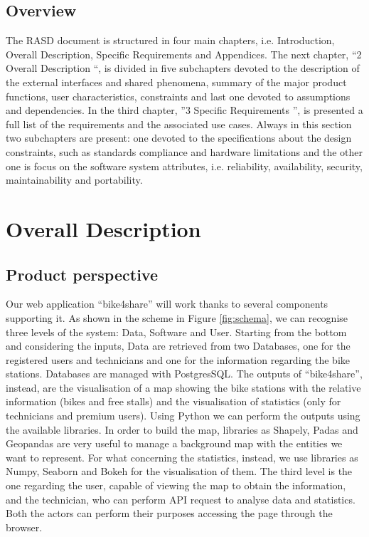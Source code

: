 \documentclass{article}
\begin{document}
\subsection{Overview}
The RASD document is structured in four main chapters, i.e. Introduction, Overall Description, Specific Requirements and Appendices. The next chapter, “2 Overall Description “, is divided in five subchapters devoted to the description of the external interfaces and shared phenomena, summary of the major product functions, user characteristics, constraints and last one devoted to assumptions and dependencies.
In the third chapter, ”3 Specific Requirements ”, is presented a full list of the requirements and the associated use cases. Always in this section two subchapters are present: one devoted to the specifications about the design constraints, such as standards compliance and hardware limitations and the other one is focus on the software system attributes, i.e. reliability, availability, security, maintainability and portability.

\section{Overall Description}
\subsection{Product perspective}
Our web application “bike4share” will work thanks to several components supporting it. As shown in the scheme in Figure \ref{fig:schema}, we can recognise three levels of the system: Data, Software and User. 
Starting from the bottom and considering the inputs, Data are retrieved from two Databases, one for the registered users and technicians and one for the information regarding the bike stations. Databases are managed with PostgresSQL.
The outputs of “bike4share”, instead, are the visualisation of a map showing the bike stations with the relative information (bikes and free stalls) and the visualisation of statistics (only for technicians and premium users). Using Python we can perform the outputs using the available libraries. In order to build the map, libraries as Shapely, Padas and Geopandas are very useful to manage a background map with the entities we want to represent. For what concerning the statistics, instead, we use libraries as Numpy, Seaborn and Bokeh for the visualisation of them. The third level is the one regarding the user, capable of viewing the map to obtain the information, and the technician, who can perform API request to analyse data and statistics. Both the actors can perform their purposes accessing the page through the browser. 
\end{document}
